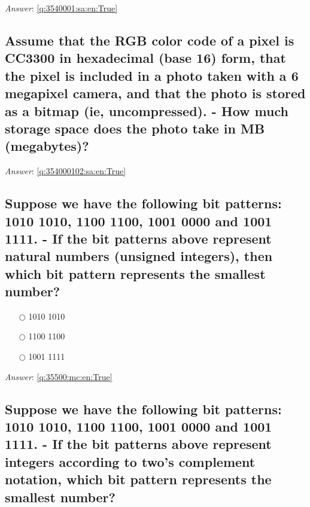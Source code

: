 \documentclass[a4paper,11pt,oneside]{article}
\begin{document}
\begin{sloppypar}
\label{q:3540001:sa:en:False}

\vspace{2cm}

\noindent\makebox[\textwidth]{\hrulefill}

\vspace{1cm}

\textit{Answer}: \autoref{q:3540001:sa:en:True}

\subsection{Assume that the RGB color code of a pixel is CC3300 in hexadecimal (base 16) form, that the pixel is included in a photo taken with a 6 megapixel camera, and that the photo is stored as a bitmap (ie, uncompressed). - How much storage space does the photo take in MB (megabytes)?}

\label{q:354000102:sa:en:False}

\vspace{2cm}

\noindent\makebox[\textwidth]{\hrulefill}

\vspace{1cm}

\textit{Answer}: \autoref{q:354000102:sa:en:True}



\subsection{Suppose we have the following bit patterns: 1010 1010, 1100 1100, 1001 0000 and 1001 1111. - If the bit patterns above represent natural numbers (unsigned integers), then which bit pattern represents the smallest number?}

\label{q:35500:mc:en:False}

\begin{itemize}
  \item[$\bigcirc$] 1010 1010
  \item[$\bigcirc$] 1100 1100
  \item[$\bigcirc$] 1001 1111
\end{itemize}

\vspace{1cm}

\textit{Answer}: \autoref{q:35500:mc:en:True}

\subsection{Suppose we have the following bit patterns: 1010 1010, 1100 1100, 1001 0000 and 1001 1111. - If the bit patterns above represent integers according to two's complement notation, which bit pattern represents the smallest number?}


\end{sloppypar}
\end{document}
